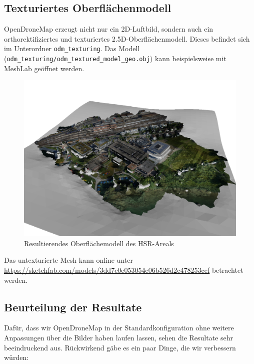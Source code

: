 \subsection{Texturiertes Oberflächenmodell}

OpenDroneMap erzeugt nicht nur ein 2D-Luftbild, sondern auch ein
orthorektifiziertes und texturiertes 2.5D-Oberflächenmodell. Dieses befindet
sich im Unterordner \texttt{odm\_texturing}. Das Modell
(\texttt{odm\_tex\-tu\-ring/\-odm\_textured\_model\_geo.obj}) kann
beispielsweise mit MeshLab geöffnet werden.

\begin{figure}[H]
	\centering
	\includegraphics[width=\textwidth]{images/odm_mesh}
	\caption{Resultierendes Oberflächemodell des HSR-Areals}
	\label{img:odm_mesh}
\end{figure}

\noindent Das untexturierte Mesh kann online unter
\url{https://sketchfab.com/models/3dd7e0e053054e06b526d2c478253cef} betrachtet
werden.

\subsection{Beurteilung der Resultate}

Dafür, dass wir OpenDroneMap in der Standardkonfiguration ohne weitere
Anpassungen über die Bilder haben laufen lassen, sehen die Resultate sehr
beeindruckend aus. Rückwirkend gäbe es ein paar Dinge, die wir verbessern
würden:

